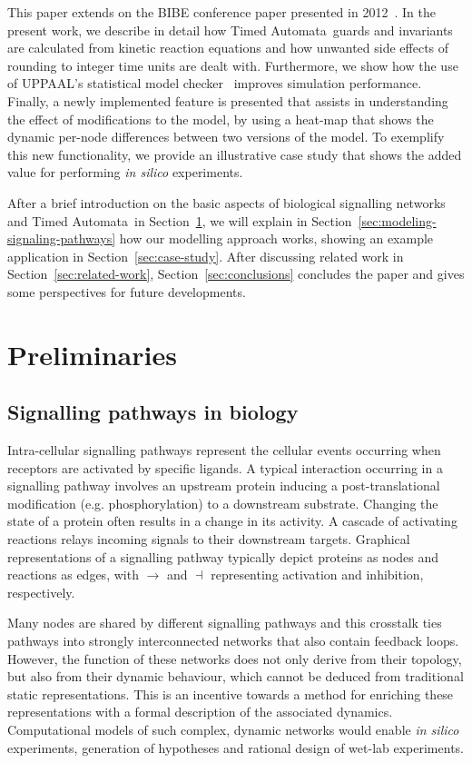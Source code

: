 \documentclass[journal, 10pt]{IEEEtran}
\def\ta{Timed Automaton}
\def\tas{Timed Automata}
\begin{document}
This paper extends on the BIBE conference paper presented in 2012~\cite{animo-bibe}. In the present work, we describe in detail how 
\tas\ guards and invariants are calculated from kinetic reaction equations and how unwanted side effects of rounding 
to integer time units are dealt with. Furthermore, we show how the use of UPPAAL's statistical model checker~\cite{uppaal-smc} improves simulation 
performance. Finally, a newly implemented feature is presented that assists in understanding the effect of 
modifications to the model, by using a heat-map that shows the dynamic per-node differences between two versions of the model. 
To exemplify this new functionality, we provide an illustrative case study that shows the added value for performing \emph{in silico} experiments.

After a brief introduction on the basic aspects of biological signalling networks and
\tas\ in Section~\ref{sec:preliminari}, we will explain in Section~\ref{sec:modeling-signaling-pathways} how our modelling approach works,
showing an example application in Section~\ref{sec:case-study}. After discussing related work in Section~\ref{sec:related-work},
Section~\ref{sec:conclusions} concludes the paper and gives some perspectives for future developments.


\def\ta{TA}
\def\tas{TA}

\section{Preliminaries}\label{sec:preliminari}

\subsection{Signalling pathways in biology}\label{sec:biologia}
Intra-cellular signalling pathways represent the cellular events occurring when receptors are activated by specific ligands.
A typical interaction occurring in a signalling pathway involves an upstream protein inducing a post-translational
modification (e.g. phosphorylation) to a downstream substrate. Changing the state of a protein often results in a change in its activity. 
A cascade of activating reactions relays incoming signals to their downstream targets. Graphical representations of a signalling pathway typically depict
proteins as nodes and reactions as edges, with $\rightarrow$ and $\dashv$ representing activation and inhibition, 
respectively.


Many nodes are shared by different signalling pathways and this crosstalk ties pathways into strongly interconnected 
networks that also contain feedback loops. However, the function of these networks does not only derive from their 
topology, but also from their dynamic behaviour, which cannot be deduced from traditional static representations.
This is an incentive towards a method for enriching these representations with a formal description 
of the associated dynamics. Computational models of such complex, dynamic networks would enable {\it in silico} 
experiments, generation of hypotheses and rational design of wet-lab experiments.
\end{document}

